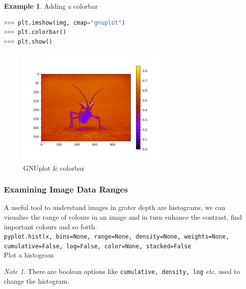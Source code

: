\documentclass{article}
\theoremstyle{definition}
\newtheorem{ex}{Example}[subsection]
\theoremstyle{remark}
\newtheorem*{nb}{Note}
\newcommand{\func}[2]{\noindent\lstinline{#1}\\#2}
\begin{document}
\begin{ex}Adding a colorbar
\begin{lstlisting}[language=Python]
>>> plt.imshow(img, cmap="gnuplot")
>>> plt.colorbar()
>>> plt.show()
\end{lstlisting}

\begin{figure}[H]
    \centering
    \includegraphics[width=0.7\textwidth]{matplotlib_col_bar}
    \caption{GNUplot \& colorbar}
    \label{fig:mpl_col_bar}
\end{figure}
\end{ex}


\subsubsection{Examining Image Data Ranges}

A useful tool to understand images in grater depth are histograms, we can visualise the range of colours in an image and in turn enhance the contrast, find important colours and so forth.\\

\func{pyplot.hist(x, bins=None, range=None, density=None, weights=None, cumulative=False, log=False, color=None, stacked=False}{Plot a histogram}

\begin{nb}
    There are boolean options like \lstinline{cumulative, density, log} \textit{etc.} used to change the histogram.
\end{nb}
\end{document}
